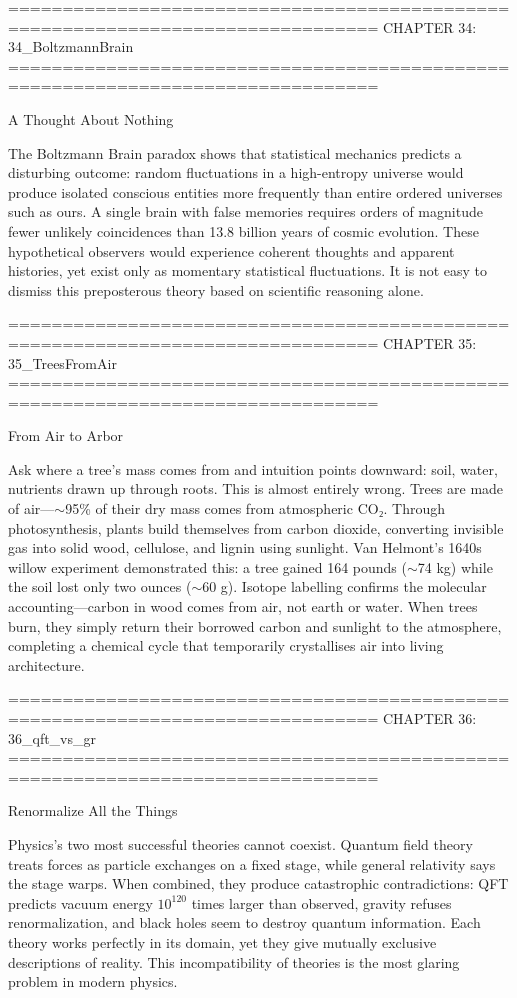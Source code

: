 ================================================================================
CHAPTER 34: 34_BoltzmannBrain
================================================================================

A Thought About Nothing

The Boltzmann Brain paradox shows that statistical mechanics predicts a disturbing outcome: random fluctuations in a high-entropy universe would produce isolated conscious entities more frequently than entire ordered universes such as ours. A single brain with false memories requires orders of magnitude fewer unlikely coincidences than 13.8 billion years of cosmic evolution. These hypothetical observers would experience coherent thoughts and apparent histories, yet exist only as momentary statistical fluctuations. It is not easy to dismiss this preposterous theory based on scientific reasoning alone.


================================================================================
CHAPTER 35: 35_TreesFromAir
================================================================================

From Air to Arbor

Ask where a tree's mass comes from and intuition points downward: soil, water, nutrients drawn up through roots. This is almost entirely wrong. Trees are made of air—$\sim$95\% of their dry mass comes from atmospheric CO₂. Through photosynthesis, plants build themselves from carbon dioxide, converting invisible gas into solid wood, cellulose, and lignin using sunlight. Van Helmont's 1640s willow experiment demonstrated this: a tree gained 164 pounds ($\sim$74 kg) while the soil lost only two ounces ($\sim$60 g). Isotope labelling confirms the molecular accounting—carbon in wood comes from air, not earth or water. When trees burn, they simply return their borrowed carbon and sunlight to the atmosphere, completing a chemical cycle that temporarily crystallises air into living architecture.


================================================================================
CHAPTER 36: 36_qft_vs_gr
================================================================================

Renormalize All the Things

Physics's two most successful theories cannot coexist. Quantum field theory treats forces as particle exchanges on a fixed stage, while general relativity says the stage warps. When combined, they produce catastrophic contradictions: QFT predicts vacuum energy $10^{120}$ times larger than observed, gravity refuses renormalization, and black holes seem to destroy quantum information. Each theory works perfectly in its domain, yet they give mutually exclusive descriptions of reality. This incompatibility of theories is the most glaring problem in modern physics.


